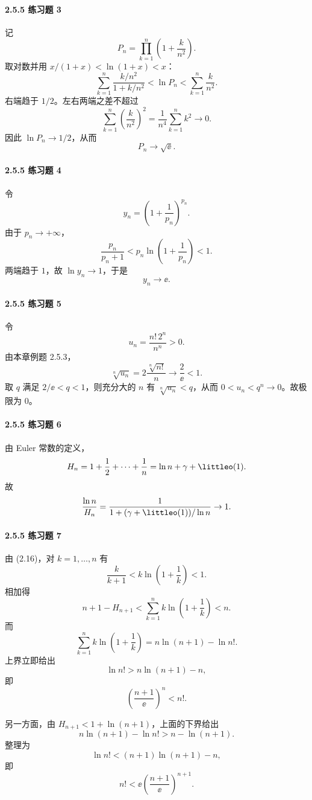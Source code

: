 \paragraph{2.5.5 练习题 3}
\begin{xsolution}
记
\[
  P_n=\prod_{k=1}^n\left(1+\frac{k}{n^2}\right).
\]
取对数并用 $x/(1+x)<\ln(1+x)<x$：
\[
  \sum_{k=1}^n\frac{k/n^2}{1+k/n^2}
  <\ln P_n
  <\sum_{k=1}^n\frac{k}{n^2}.
\]
右端趋于 $1/2$。左右两端之差不超过
\[
  \sum_{k=1}^n\left(\frac{k}{n^2}\right)^2
  =\frac1{n^4}\sum_{k=1}^n k^2\to0.
\]
因此 $\ln P_n\to1/2$，从而
\[
  \boxed{P_n\to\sqrt\ee}.
\]
\end{xsolution}

\paragraph{2.5.5 练习题 4}
\begin{xsolution}
令
\[
  y_n=\left(1+\frac1{p_n}\right)^{p_n}.
\]
由于 $p_n\to+\infty$，
\[
  \frac{p_n}{p_n+1}
  <p_n\ln\left(1+\frac1{p_n}\right)<1.
\]
两端趋于 $1$，故 $\ln y_n\to1$，于是
\[
  \boxed{y_n\to\ee}.
\]
\end{xsolution}

\paragraph{2.5.5 练习题 5}
\begin{xsolution}
令
\[
  u_n=\frac{n!\,2^n}{n^n}>0.
\]
由本章例题 2.5.3，
\[
  \sqrt[n]{u_n}=2\frac{\sqrt[n]{n!}}n\to\frac2\ee<1.
\]
取 $q$ 满足 $2/\ee<q<1$，则充分大的 $n$ 有 $\sqrt[n]{u_n}<q$，从而 $0<u_n<q^n\to0$。故极限为 $0$。
\end{xsolution}

\paragraph{2.5.5 练习题 6}
\begin{xsolution}
由 Euler 常数的定义，
\[
  H_n=1+\frac12+\cdots+\frac1n
  =\ln n+\gamma+\littleo(1).
\]
故
\[
  \frac{\ln n}{H_n}
  =\frac1{1+(\gamma+\littleo(1))/\ln n}\to1.
\]
\end{xsolution}

\paragraph{2.5.5 练习题 7}
\begin{xsolution}
由 (2.16)，对 $k=1,\ldots,n$ 有
\[
  \frac{k}{k+1}<k\ln\left(1+\frac1k\right)<1.
\]
相加得
\[
  n+1-H_{n+1}
  <\sum_{k=1}^n k\ln\left(1+\frac1k\right)<n.
\]
而
\[
  \sum_{k=1}^n k\ln\left(1+\frac1k\right)
  =n\ln(n+1)-\ln n!.
\]
上界立即给出
\[
  \ln n!>n\ln(n+1)-n,
\]
即
\[
  \left(\frac{n+1}{\ee}\right)^n<n!.
\]

另一方面，由 $H_{n+1}<1+\ln(n+1)$，上面的下界给出
\[
  n\ln(n+1)-\ln n!>n-\ln(n+1).
\]
整理为
\[
  \ln n!<(n+1)\ln(n+1)-n,
\]
即
\[
  n!<\ee\left(\frac{n+1}{\ee}\right)^{n+1}.
\]
\end{xsolution}

